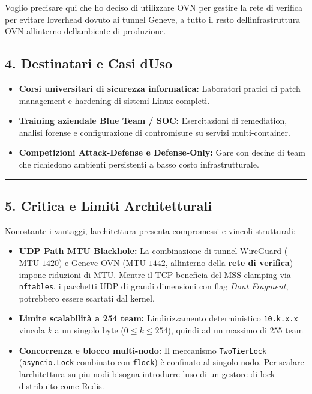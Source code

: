 Voglio precisare qui che ho deciso di utilizzare OVN per gestire la rete
di verifica per evitare l\textquotesingle overhead dovuto ai tunnel
Geneve, a tutto il resto dell\textquotesingle infrastruttura OVN
all\textquotesingle interno dell\textquotesingle ambiente di produzione.

\subsection{4. Destinatari e Casi
d\textquotesingle Uso}\label{4-destinatari-e-casi-duso}

\begin{itemize}
\tightlist
\item
  \textbf{Corsi universitari di sicurezza informatica:} Laboratori
  pratici di patch management e hardening di sistemi Linux completi.
\item
  \textbf{Training aziendale Blue Team / SOC:} Esercitazioni di
  remediation, analisi forense e configurazione di contromisure su
  servizi multi-container.
\item
  \textbf{Competizioni Attack-Defense e Defense-Only:} Gare con decine
  di team che richiedono ambienti persistenti a basso costo
  infrastrutturale.
\end{itemize}

\begin{center}\rule{0.5\linewidth}{0.5pt}\end{center}

\subsection{5. Critica e Limiti
Architetturali}\label{5-critica-e-limiti-architetturali}

Nonostante i vantaggi, l\textquotesingle architettura presenta
compromessi e vincoli strutturali:

\begin{itemize}
\tightlist
\item
  \textbf{UDP Path MTU Blackhole:} La combinazione di tunnel WireGuard
  (\(\text{MTU } 1420\)) e Geneve OVN (\(\text{MTU } 1442\),
  all\textquotesingle interno della \textbf{rete di verifica}) impone
  riduzioni di MTU. Mentre il TCP beneficia del MSS clamping via
  \passthrough{\lstinline!nftables!}, i pacchetti UDP di grandi
  dimensioni con flag \emph{Don\textquotesingle t Fragment}, potrebbero
  essere scartati dal kernel.
\item
  \textbf{Limite scalabilità a 254 team:}
  L\textquotesingle indirizzamento deterministico
  \passthrough{\lstinline!10.k.x.x!} vincola \(k\) a un singolo byte
  (\(0 \le k \le 254\)), quindi ad un massimo di \(\text{255}\) team
\item
  \textbf{Concorrenza e blocco multi-nodo:} Il meccanismo
  \passthrough{\lstinline!TwoTierLock!}
  (\passthrough{\lstinline!asyncio.Lock!} combinato con
  \passthrough{\lstinline!flock!}) è confinato al singolo nodo. Per
  scalare l\textquotesingle architettura su piu nodi bisogna introdurre
  l\textquotesingle uso di un gestore di lock distribuito come Redis.
\end{itemize}
